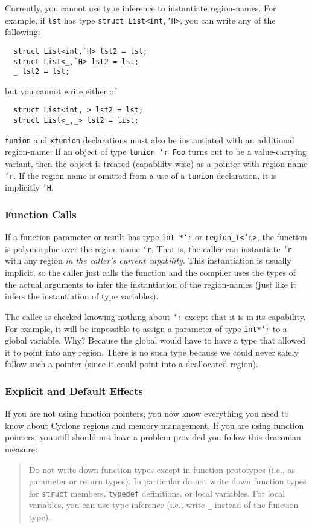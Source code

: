 Currently, you cannot use type inference to instantiate region-names.
For example, if \texttt{lst} has type \texttt{struct List<int,`H>}, you
can write any of the following:
\begin{verbatim}
  struct List<int,`H> lst2 = lst;
  struct List<_,`H> lst2 = lst;
  _ lst2 = lst;
\end{verbatim}
but you cannot write either of
\begin{verbatim}
  struct List<int,_> lst2 = lst;
  struct List<_,_> lst2 = list;
\end{verbatim}

\texttt{tunion} and \texttt{xtunion} declarations must also be
instantiated with an additional region-name.  If an object of type
\texttt{tunion `r Foo} turns out to be a value-carrying variant, then
the object is treated (capability-wise) as a pointer with region-name
\texttt{`r}.  If the region-name is omitted from a use of a
\texttt{tunion} declaration, it is implicitly \texttt{`H}.

\subsubsection{Function Calls}

If a function parameter or result has type \texttt{int *`r} or
\texttt{region_t<`r>}, the function is polymorphic over the region-name
\texttt{`r}.  That is, the caller can instantiate \texttt{`r} with any
region \emph{in the caller's current capability}. This instantiation
is usually implicit, so the caller just calls the function and the
compiler uses the types of the actual arguments to infer the
instantiation of the region-names (just like it infers the
instantiation of type variables).

The callee is checked knowing nothing about \texttt{`r} except that it
is in its capability.  For example, it will be impossible to assign a
parameter of type \texttt{int*`r} to a global variable.  Why?  Because
the global would have to have a type that allowed it to point into any
region.  There is no such type because we could never safely follow
such a pointer (since it could point into a deallocated region).

\subsubsection{Explicit and Default Effects}

If you are not using function pointers, you now know everything you
need to know about Cyclone regions and memory management.  If you are
using function pointers, you still should not have a problem provided
you follow this draconian measure:
\begin{quote}
  Do not write down function types except in function prototypes
  (i.e., as parameter or return types).  In particular do not write
  down function types for \texttt{struct} members, \texttt{typedef}
  definitions, or local variables.  For local variables, you can use
  type inference (i.e., write \texttt{_} instead of the function type).
\end{quote}

